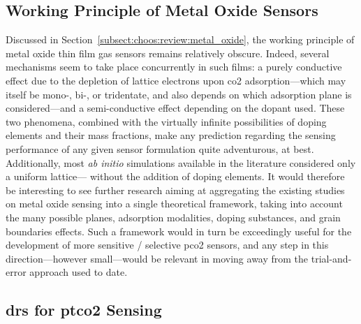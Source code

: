 \subsection{Working Principle of Metal Oxide Sensors}

Discussed in Section~\ref{subsect:choos:review:metal_oxide}, the working principle of metal oxide thin film gas sensors remains relatively obscure. Indeed, several mechanisms seem to take place concurrently in such films: a purely conductive effect due to the depletion of lattice electrons upon \gls{co2} adsorption---which may itself be mono-, bi-, or tridentate\cite{usseinov2019}, and also depends on which adsorption plane is considered\cite{tang2013}---and a semi-conductive effect depending on the dopant used\cite{niu2004, sato2007, ra2010}. These two phenomena, combined with the virtually infinite possibilities of doping elements and their mass fractions, make any prediction regarding the sensing performance of any given sensor formulation quite adventurous, at best. Additionally, most \textit{ab initio} simulations available in the literature considered only a uniform lattice---\ie{} without the addition of doping elements. It would therefore be interesting to see further research aiming at aggregating the existing studies on metal oxide sensing into a single theoretical framework, taking into account the many possible planes, adsorption modalities, doping substances, and grain boundaries effects. Such a framework would in turn be exceedingly useful for the development of more sensitive / selective \gls{pco2} sensors, and any step in this direction---however small---would be relevant in moving away from the trial-and-error approach used to date.

\subsection{\texorpdfstring{\gls{drs} for \gls{ptco2} Sensing}{DRS for tcpCO2 Sensing}}

